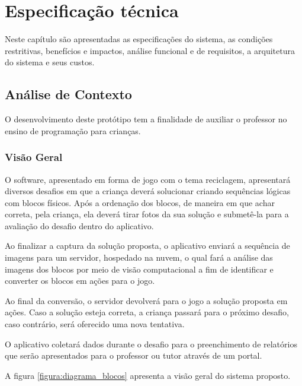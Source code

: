 \chapter{Especificação técnica} \label{cap:especificacao_tecnica}
Neste capítulo são apresentadas as especificações do sistema, as condições restritivas, benefícios e impactos, análise funcional e de requisitos, a arquitetura do sistema e seus custos.

\section{Análise de Contexto}

    O desenvolvimento deste protótipo tem a finalidade de auxiliar o professor no ensino de programação para crianças.
    
    \subsection{Visão Geral}
    
    O software, apresentado em forma de jogo com o tema reciclagem, apresentará diversos desafios em que a criança deverá solucionar criando sequências lógicas com blocos físicos. Após a ordenação dos blocos, de maneira em que achar correta, pela criança, ela deverá tirar fotos da sua solução e submetê-la para a avaliação do desafio dentro do aplicativo.
    
    Ao finalizar a captura da solução proposta, o aplicativo enviará a sequência de imagens para um servidor, hospedado na nuvem, o qual fará a análise das imagens dos blocos
    por meio de visão computacional a fim de identificar e converter os blocos em ações para o jogo.
    
    Ao final da conversão, o servidor devolverá para o jogo a solução proposta em ações.
    Caso a solução esteja correta, a criança passará para o próximo desafio, caso contrário, será oferecido uma nova tentativa.
    
    O aplicativo coletará dados durante o desafio para o preenchimento de relatórios que serão apresentados para o professor ou tutor através de um portal.
    
    A figura \ref{figura:diagrama_blocos} apresenta a visão geral do sistema proposto.
  

